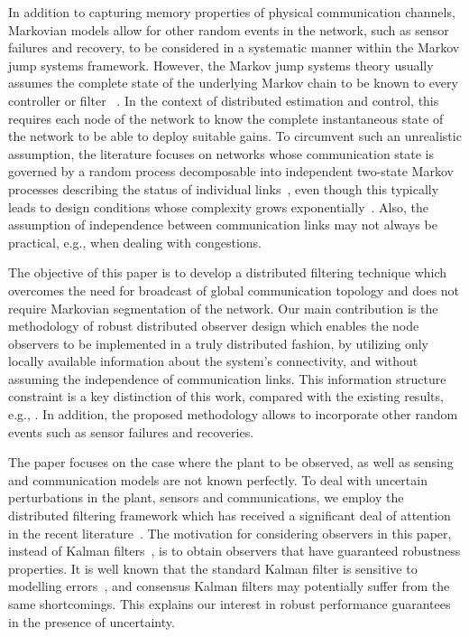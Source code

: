 \documentclass[a4paper,twocolumn]{autart}
\begin{document}
In addition to capturing memory properties of physical communication channels,
Markovian models allow for other random events in the
network, such as sensor failures and recovery,  to be considered in a
systematic manner within the
Markov jump systems framework. However, the Markov jump
systems theory usually assumes the complete
state of the underlying Markov chain to be known to every  controller or
filter~\cite{LUO1}
. In the context of
distributed estimation and control, this requires each node
of the network to know the complete instantaneous state of the network to
be able to deploy suitable gains. To circumvent such an
unrealistic assumption, the literature focuses on networks whose
communication state is governed by a random process decomposable
into independent two-state Markov processes describing the status of
individual links~\cite{LGM-2006,SS-2009}, even though this typically leads to  design conditions whose complexity
grows exponentially~\cite{LGM-2006}. Also, the
assumption of independence between communication links may not always be
practical, e.g., when dealing with congestions.

The objective of this paper is to develop a distributed filtering technique
which overcomes the need for broadcast of global communication topology and
does not require Markovian segmentation of the network. Our main
contribution is the methodology of robust distributed observer design
which enables the node observers to be implemented in a truly distributed
fashion, by utilizing only locally available information about the system's
connectivity, and without assuming the independence of communication
links. This information structure constraint is a key
distinction of this work, compared with the existing results, e.g.,
\cite{SS-2009,LGM-2006}.  In addition, the proposed methodology allows to
incorporate other random events such as sensor failures and recoveries.   


The paper focuses on the case where the plant to be observed, as well
as sensing and communication models are not known perfectly. To deal with uncertain perturbations in the
plant, sensors and communications, we employ the distributed 
filtering framework which has received a significant deal of attention in
the recent literature~\cite{SWH-2010,U6,LaU1}. 
The motivation for
considering  observers in this paper, instead of Kalman filters~\cite{SS-2009},
is to obtain observers that have guaranteed robustness 
properties. It is well known that the standard Kalman filter 
is sensitive to modelling errors~\cite{PSB}, and
consensus Kalman filters may
potentially suffer from the same shortcomings. 
This explains our interest in robust performance guarantees in the presence of  
uncertainty. 
\end{document}
